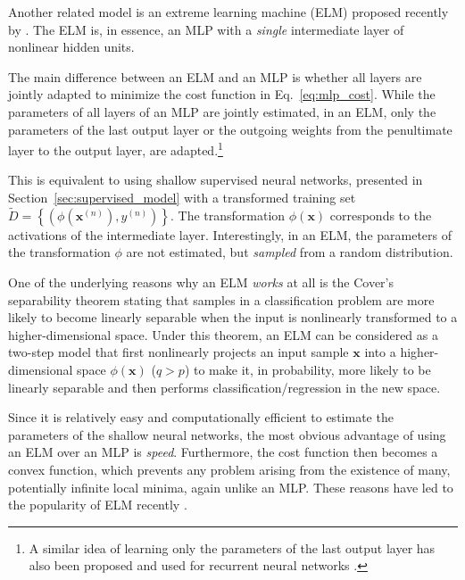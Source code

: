\documentclass[dissertation,nocontribution]{aaltoseries}
\newcommand{\vect}[1]{\mathbf{#1}}
\newcommand{\vx}[0]{\vect{x}}
\begin{document}
Another related model is an extreme learning machine
(ELM) proposed
recently by \citet{Huang2006}. The ELM is, in essence, an
MLP with a \textit{single} intermediate layer of nonlinear
hidden units.

The main difference between an ELM and an MLP is whether all
layers are jointly adapted to minimize the cost function in
Eq.~\eqref{eq:mlp_cost}. While the parameters of all layers
of an MLP are jointly estimated, in an ELM, only the
parameters of the last output layer or the outgoing weights
from the penultimate layer to the output layer, are
adapted.\footnote{
A similar idea of learning only the parameters of the last
output layer has also been proposed and used for
recurrent neural networks \citep[see, e.g.,][]{Jaeger2009}.
}

This is equivalent to using shallow supervised neural
networks, presented in Section~\ref{sec:supervised_model}
with a transformed training set $\tilde{D}=\left\{ \left(
\phi(\vx^{(n)}), y^{(n)} \right) \right\}$. The
transformation $\phi(\vx)$ corresponds to the activations of
the intermediate layer.  Interestingly, in an ELM, the
parameters of the transformation $\phi$ are not estimated,
but \textit{sampled} from a random distribution.

One of the underlying reasons why an ELM \textit{works} at
all is the Cover's separability theorem
\citep{Cover1965}
stating that samples in a
classification problem are more likely to become linearly
separable when the input is nonlinearly transformed to a
higher-dimensional space. Under this theorem, an ELM can be
considered as a two-step model that first nonlinearly
projects an input sample $\vx$ into a higher-dimensional
space $\phi(\vx)$ ($q > p$) to make it, in probability, more
likely to be linearly separable and then performs
classification/regression in the new space.

Since it is relatively easy and computationally efficient to
estimate the parameters of the shallow neural networks, the
most obvious advantage of using an ELM over an MLP is
\textit{speed}. Furthermore, the cost function then
becomes a convex function, which prevents any problem
arising from the existence of many, potentially infinite
local minima, again unlike an MLP. These reasons have led
to the popularity of ELM recently \citep{Huang2011}.



\end{document}

